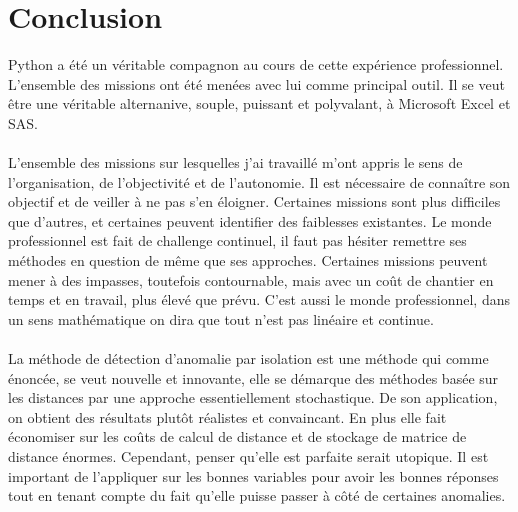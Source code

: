 \chapter*{Conclusion}

Python a été un véritable compagnon au cours de cette expérience professionnel. L'ensemble des missions ont été menées avec lui comme principal outil. Il se veut être une véritable alternanive, souple, puissant et polyvalant, à Microsoft Excel et SAS.
\\
\\
L'ensemble des missions sur lesquelles j'ai travaillé m'ont appris le sens de l'organisation, de l'objectivité et de l'autonomie. Il est nécessaire de connaître son objectif et de veiller à ne pas s'en éloigner. Certaines missions sont plus difficiles que d'autres, et certaines peuvent identifier des faiblesses existantes. Le monde professionnel est fait de challenge continuel, il faut pas hésiter remettre ses méthodes en question de même que ses approches. Certaines missions peuvent mener à des impasses, toutefois contournable, mais avec un coût de chantier en temps et en travail, plus élevé que prévu. C'est aussi le monde professionnel, dans un sens mathématique on dira que tout n'est pas linéaire et continue.
\\
\\
La méthode de détection d'anomalie par isolation est une méthode qui comme énoncée, se veut nouvelle et innovante, elle se démarque des méthodes basée sur les distances par une approche essentiellement stochastique. De son application, on obtient des résultats plutôt réalistes et convaincant. En plus elle fait économiser sur les coûts de calcul de distance et de stockage de matrice de distance énormes. Cependant, penser qu'elle est parfaite serait utopique. Il est important de l'appliquer sur les bonnes variables pour avoir les bonnes réponses tout en tenant compte du fait qu'elle puisse passer à côté de certaines anomalies.